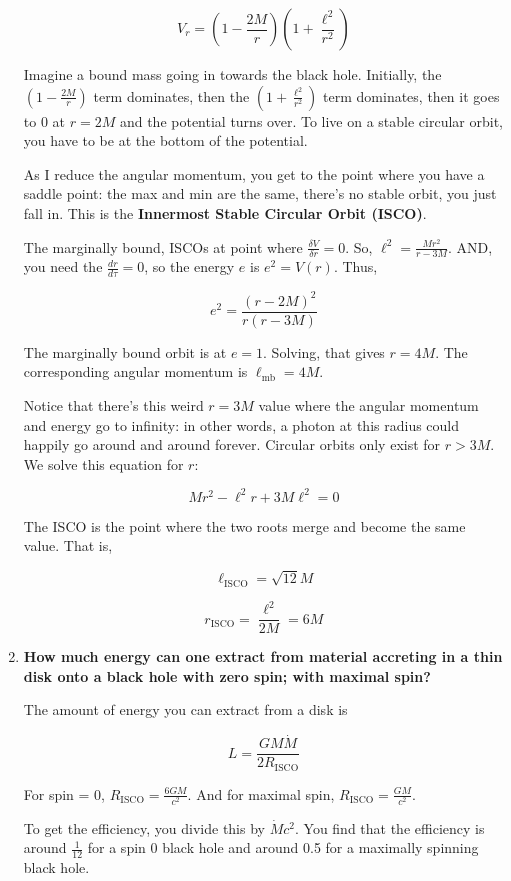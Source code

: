 \documentclass[a4paper]{article}
\begin{document}
\begin{enumerate}
$$V_r = \left(1-\frac{2M}{r}\right)\left(1+\frac{\ell^2}{r^2} \right)$$

Imagine a bound mass going in towards the black hole. Initially, the $ \left(1-\frac{2M}{r}\right)$ term dominates, then the $\left(1+\frac{\ell^2}{r^2} \right)$ term dominates, then it goes to 0 at $r = 2M$ and the potential turns over. To live on a stable circular orbit, you have to be at the bottom of the potential. 

As I reduce the angular momentum, you get to the point where you have a saddle point: the max and min are the same, there's no stable orbit, you just fall in. This is the \textbf{Innermost Stable Circular Orbit (ISCO)}. 

The marginally bound, ISCOs at point where $\frac{\delta V}{\delta r}=0$.
So, $\ell^2 = \frac{Mr^2}{r-3M}$. AND, you need the $\frac{dr}{d\tau}=0$, so the energy $e$ is $e^2 = V(r)$. Thus,

$$ e^2 = \frac{(r-2M)^2}{r(r-3M)} $$

The marginally bound orbit is at $e=1$. Solving, that gives $r=4M$. The corresponding angular momentum is $\ell_\mathrm{mb}=4M$. 

Notice that there's this weird $r=3M$ value where the angular momentum and energy go to infinity: in other words, a photon at this radius could happily go around and around forever. Circular orbits only exist for $r > 3M$. We solve this equation for $r$:

$$ M r^2 - \ell^2 r + 3 M \ell^2 = 0 $$

The ISCO is the point where the two roots merge and become the same value. That is,

$$ \ell_\mathrm{ISCO} = \sqrt{12} M $$ 

$$ r_\mathrm{ISCO} = \frac{\ell^2}{2M} = 6M $$

\item \textbf{How much energy can one extract from material accreting in a thin disk onto a black hole with zero spin; with maximal spin?}

The amount of energy you can extract from a disk is

\begin{equation}
L = \frac{G M \dot{M}}{2 R_\mathrm{ISCO}}
\end{equation}

For spin = 0, $ R_\mathrm{ISCO} = \frac{6 GM}{c^2}$. And for maximal spin, $ R_\mathrm{ISCO} = \frac{GM}{c^2} $. 

To get the efficiency, you divide this by $\dot{M}c^2$. You find that the efficiency is around $\frac{1}{12}$ for a spin 0 black hole and around 0.5 for a maximally spinning black hole. 


\end{enumerate}
\end{document}

